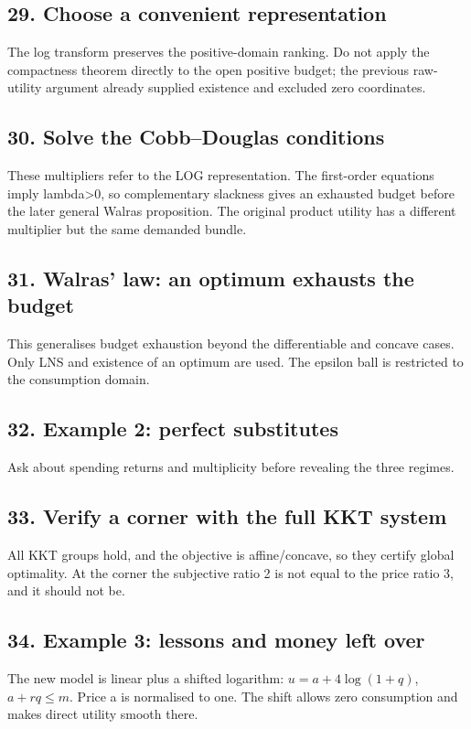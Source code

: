 \documentclass[11pt,a4paper]{article}
\begin{document}
\subsection*{29. Choose a convenient representation}
The log transform preserves the positive-domain ranking. Do not apply the compactness theorem directly to the open positive budget; the previous raw-utility argument already supplied existence and excluded zero coordinates.

\subsection*{30. Solve the Cobb--Douglas conditions}
These multipliers refer to the LOG representation. The first-order equations imply lambda>0, so complementary slackness gives an exhausted budget before the later general Walras proposition. The original product utility has a different multiplier but the same demanded bundle.

\subsection*{31. Walras’ law: an optimum exhausts the budget}
This generalises budget exhaustion beyond the differentiable and concave cases. Only LNS and existence of an optimum are used. The epsilon ball is restricted to the consumption domain.

\subsection*{32. Example 2: perfect substitutes}
Ask about spending returns and multiplicity before revealing the three regimes.

\subsection*{33. Verify a corner with the full KKT system}
All KKT groups hold, and the objective is affine/concave, so they certify global optimality. At the corner the subjective ratio 2 is not equal to the price ratio 3, and it should not be.

\subsection*{34. Example 3: lessons and money left over}
The new model is linear plus a shifted logarithm: $u=a+4\log(1+q)$, $a+rq\le m$. Price a is normalised to one. The shift allows zero consumption and makes direct utility smooth there.
\end{document}
